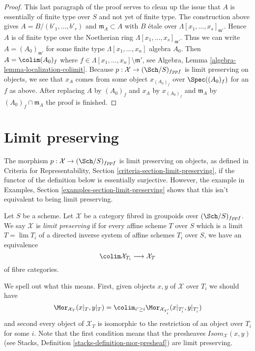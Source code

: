 \begin{proof}
\medskip\noindent
This last paragraph of the proof serves to clean up the issue that $A$ is
essentially of finite type over $S$ and not yet of finite type.
The construction above gives $A = B/(b'_1, \ldots, b'_r)$ and
$\mathfrak m_A \subset A$ with $B$ \'etale over
$\Lambda[x_1, \ldots, x_s]_{\mathfrak m'}$. Hence $A$ is of finite
type over the Noetherian ring $\Lambda[x_1, \ldots, x_s]_{\mathfrak m'}$.
Thus we can write $A = (A_0)_{\mathfrak m'}$ for some finite type
$\Lambda[x_1, \ldots, x_n]$ algebra $A_0$. Then
$A = \colim (A_0)_f$ where
$f \in \Lambda[x_1, \ldots, x_n] \setminus \mathfrak m'$, see
Algebra, Lemma \ref{algebra-lemma-localization-colimit}.
Because $p : \mathcal{X} \to (\Sch/S)_{fppf}$ is limit preserving on
objects, we see that
$x_A$ comes from some object $x_{(A_0)_f}$ over $\Spec((A_0)_f)$ for
an $f$ as above. After replacing $A$ by $(A_0)_f$ and $x_A$ by
$x_{(A_0)_f}$ and $\mathfrak m_A$ by $(A_0)_f \cap \mathfrak m_A$
the proof is finished.
\end{proof}





\section{Limit preserving}
\label{section-limits}

\noindent
The morphism $p : \mathcal{X} \to (\Sch/S)_{fppf}$ is limit preserving
on objects, as defined in Criteria for Representability, Section
\ref{criteria-section-limit-preserving}, if the functor of the definition
below is essentially surjective. However, the example
in Examples, Section \ref{examples-section-limit-preserving}
shows that this isn't equivalent to being limit preserving.

\begin{definition}
\label{definition-limit-preserving}
Let $S$ be a scheme. Let $\mathcal{X}$ be a category fibred in groupoids
over $(\Sch/S)_{fppf}$. We say $\mathcal{X}$ is {\it limit preserving}
if for every affine scheme $T$ over $S$ which is a limit $T = \lim T_i$
of a directed inverse system of affine schemes $T_i$ over $S$, we have
an equivalence
$$
\colim \mathcal{X}_{T_i} \longrightarrow \mathcal{X}_T
$$
of fibre categories.
\end{definition}

\noindent
We spell out what this means. First, given objects $x, y$ of $\mathcal{X}$
over $T_i$ we should have
$$
\Mor_{\mathcal{X}_T}(x|_T, y|_T) =
\colim_{i' \geq i} \Mor_{\mathcal{X}_{T_i'}}(x|_{T_i'}, y|_{T_i'})
$$
and second every object of $\mathcal{X}_T$ is isomorphic to the restriction
of an object over $T_i$ for some $i$. Note that the first condition means
that the presheaves $\mathit{Isom}_\mathcal{X}(x, y)$ (see
Stacks, Definition \ref{stacks-definition-mor-presheaf})
are limit preserving.


